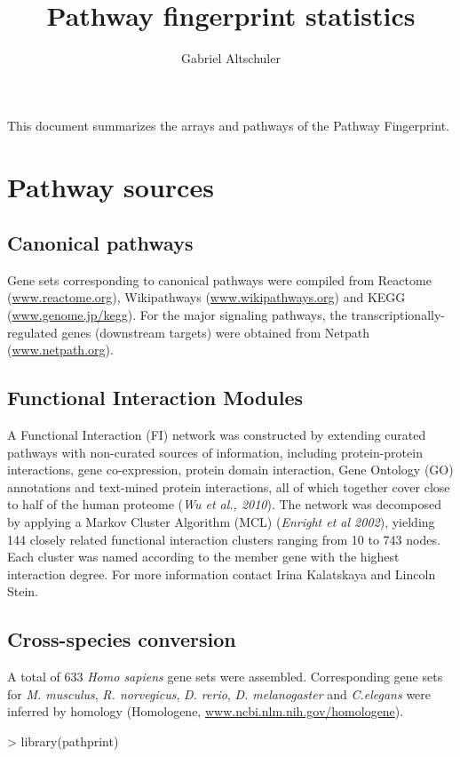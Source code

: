 \documentclass{article}
\renewenvironment{Schunk}{\vspace{\topsep}}{\vspace{\topsep}}
\begin{document}
\title{Pathway fingerprint statistics}
\author{Gabriel Altschuler}
\maketitle
This document summarizes the arrays and pathways of the Pathway Fingerprint.
\section{Pathway sources}
\subsection{Canonical pathways}
Gene sets corresponding to canonical pathways were compiled from Reactome (\url{www.reactome.org}), Wikipathways (\url{www.wikipathways.org}) and KEGG (\url{www.genome.jp/kegg}). For the major signaling pathways, the transcriptionally-regulated genes (downstream targets) were obtained from Netpath (\url{www.netpath.org}).
\subsection{Functional Interaction Modules}
A Functional Interaction (FI) network was constructed by extending curated pathways with non-curated sources of information, including protein-protein interactions, gene co-expression, protein domain interaction, Gene Ontology (GO) annotations and text-mined protein interactions, all of which together cover close to half of the human proteome (\emph{Wu et al., 2010}). The network was decomposed by applying a Markov Cluster Algorithm (MCL) (\emph{Enright et al 2002}), yielding 144 closely related functional interaction clusters ranging from 10 to 743 nodes. Each cluster was named according to the member gene with the highest interaction degree. For more information contact Irina Kalatskaya and Lincoln Stein.
\subsection{Cross-species conversion}
A total of 633 \emph{Homo sapiens} gene sets were assembled. Corresponding gene sets for \emph{M. musculus}, \emph{R. norvegicus}, \emph{D. rerio}, \emph{D. melanogaster} and \emph{C.elegans} were inferred by homology (Homologene, \url{www.ncbi.nlm.nih.gov/homologene}).
\begin{Schunk}
\begin{Sinput}
> library(pathprint)
\end{Sinput}
\end{Schunk}
\end{document}
